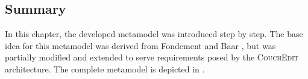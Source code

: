 \subsection{Summary}

In this chapter, the developed metamodel was introduced step by step. The base idea for this metamodel was derived from Fondement and Baar \cite{fondement_making_2005}, but was partially modified and extended to serve requirements posed by the \textsc{CouchEdit} architecture. The complete metamodel is depicted in .
